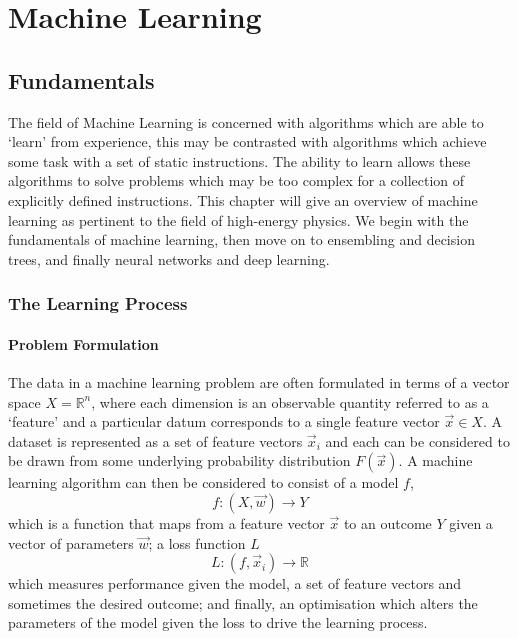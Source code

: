 \chapter{Machine Learning}
\label{chap:machine_learning}


\newpage

\section{Fundamentals}
The field of Machine Learning is concerned with algorithms which are able to `learn' from experience, this may be contrasted with algorithms which achieve some task with a set of static instructions. The ability to learn allows these algorithms to solve problems which may be too complex for a collection of explicitly defined instructions. 
This chapter will give an overview of machine learning as pertinent to the field of high-energy physics. We begin with the fundamentals of machine learning, then move on to ensembling and decision trees, and finally neural networks and deep learning.  


\subsection{The Learning Process}

\subsubsection{Problem Formulation}
The data in a machine learning problem are often formulated in terms of a vector space $X = \mathds{R}^{n}$, where each dimension is an observable quantity referred to as a `feature' and a particular datum corresponds to a single feature vector $\vec{x} \in X$. A dataset is represented as a set of feature vectors $\vec{x}_{i}$ and each can be considered to be drawn from some underlying probability distribution $F(\vec{x})$.
A machine learning algorithm can then be considered to consist of a model $f$, 
\begin{equation}
    f:(X,\vec{w})\rightarrow{Y}
\end{equation}
which is a function that maps from a feature vector $\vec{x}$ to an outcome $Y$ given a vector of parameters $\vec{w}$; a loss function $L$
\begin{equation}
    L:(f,\vec{x}_{i})\rightarrow{\mathds{R}}
\end{equation}
which measures performance given the model, a set of feature vectors and sometimes the desired outcome; 
and finally, an optimisation which alters the parameters of the model given the loss to drive the learning process.


